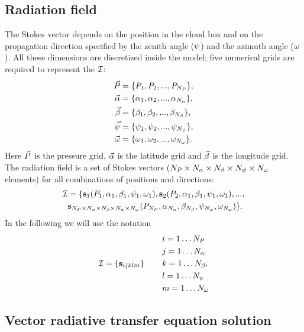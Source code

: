 \subsection{Radiation field}
\label{sec:scattering:rad_field}
The Stokes vector depends on the
position in the cloud box and on the propagation direction specified
by the zenith angle ($\psi$) and the azimuth angle ($\omega$). All
these dimensions are discretized inside the model; five
numerical grids are required to represent the 
${\mathcal I}$:
\begin{eqnarray}
  \vec{P} &= \{ P_1, P_2, ... , P_{N_{P}}\}, \nonumber \\
  \vec{\alpha} &= \{ \alpha_1, \alpha_2, ... , \alpha_{N_{\alpha}}\}, \nonumber \\
  \vec{\beta} &= \{\beta_1, \beta_2, ... , \beta_{N_{\beta}}\}, \\
  \vec{\psi} &= \{\psi_1, \psi_2, ... , \psi_{N_{\psi}}\}, \nonumber \\
  \vec{\omega} &= \{\omega_1, \omega_2, ... , \omega_{N_{\omega}}\}. \nonumber 
\end{eqnarray}
Here $\vec{P}$ is the pressure grid, $\vec{\alpha}$ is the latitude
grid and $\vec{\beta}$ is the longitude grid.
The radiation field is a set of Stokes vectors ($N_{P}\times N_{\alpha}
\times N_{\beta} \times N_{\psi} \times N_{\omega}$ elements) for all
combinations of positions and directions:
\begin{eqnarray}
  {\mathcal I} &= \{ {\bf s}_1(P_1,\alpha_1, \beta_1, \psi_1, \omega_1),
  {\bf s}_2(P_2,\alpha_1, \beta_1, \psi_1, \omega_1), ... , \nonumber \\ 
  &{\bf s}_{N_{P}\times N_{\alpha} \times N_{\beta} \times N_{\psi} \times N_{\omega}}
  (P_{N_{P}},\alpha_{N_{\alpha}}, \beta_{N_{\beta}}, \psi_{N_{\psi}}, 
  \omega_{N_{\omega}}) \}. 
\end{eqnarray}
In the following we will use the notation
\begin{eqnarray}
  & i = 1 \ldots N_{P}  \nonumber \\
  & j = 1 \ldots N_{\alpha}  \nonumber \\
  {\mathcal I} = \left\{{\bf s}_{ijklm}\right\}  \hspace{5ex}&
  k = 1 \ldots N_{\beta}. \\
  &  l = 1 \ldots N_{\psi}  \nonumber \\
  &  m = 1 \ldots N_{\omega}  \nonumber
\end{eqnarray}

\subsection{Vector radiative transfer equation solution} 
\label{sec:scattering:VRTE_sol}

